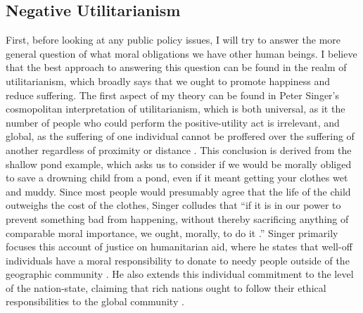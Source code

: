 \documentclass[12pt]{article}
\begin{document}
\subsection*{Negative Utilitarianism}
First, before looking at any public policy issues, I will try to answer the more general question of what moral obligations we have other human beings.
I believe that the best approach to answering this question can be found in the realm of utilitarianism, which broadly says that we ought to promote happiness and reduce suffering.
The first aspect of my theory can be found in Peter Singer's cosmopolitan interpretation of utilitarianism, which is both universal, as it the number of people who could perform the positive-utility act is irrelevant, and global, as the suffering of one individual cannot be proffered over the suffering of another regardless of proximity or distance \autocite[154]{widdows2012}.
This conclusion is derived from the shallow pond example, which asks us to consider if we would be morally obliged to save a drowning child from a pond, even if it meant getting your clothes wet and muddy.
Since most people would presumably agree that the life of the child outweighs the cost of the clothes, Singer colludes that ``if it is in our power to prevent something bad from happening, without thereby sacrificing anything of comparable moral importance, we ought, morally, to do it \autocite[153]{widdows2012}.'' 
Singer primarily focuses this account of justice on humanitarian aid, where he states that well-off individuals have a moral responsibility to donate to needy people outside of the geographic community \autocite[155]{widdows2012}.
He also extends this individual commitment to the level of the nation-state, claiming that rich nations ought to follow their ethical responsibilities to the global community \autocite[15]{singer2016}.
\end{document}
